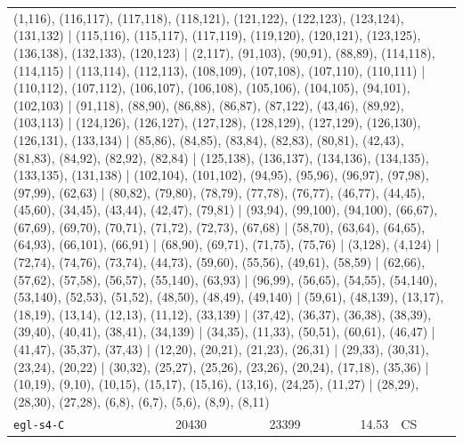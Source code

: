 \begin{longtable}{lrrrl}
\multicolumn{5}{p{0.96\linewidth}}{\tiny\raggedright\arraybackslash (1,116), (116,117), (117,118), (118,121), (121,122), (122,123), (123,124), (131,132) | (115,116), (115,117), (117,119), (119,120), (120,121), (123,125), (136,138), (132,133), (120,123) | (2,117), (91,103), (90,91), (88,89), (114,118), (114,115) | (113,114), (112,113), (108,109), (107,108), (107,110), (110,111) | (110,112), (107,112), (106,107), (106,108), (105,106), (104,105), (94,101), (102,103) | (91,118), (88,90), (86,88), (86,87), (87,122), (43,46), (89,92), (103,113) | (124,126), (126,127), (127,128), (128,129), (127,129), (126,130), (126,131), (133,134) | (85,86), (84,85), (83,84), (82,83), (80,81), (42,43), (81,83), (84,92), (82,92), (82,84) | (125,138), (136,137), (134,136), (134,135), (133,135), (131,138) | (102,104), (101,102), (94,95), (95,96), (96,97), (97,98), (97,99), (62,63) | (80,82), (79,80), (78,79), (77,78), (76,77), (46,77), (44,45), (45,60), (34,45), (43,44), (42,47), (79,81) | (93,94), (99,100), (94,100), (66,67), (67,69), (69,70), (70,71), (71,72), (72,73), (67,68) | (58,70), (63,64), (64,65), (64,93), (66,101), (66,91) | (68,90), (69,71), (71,75), (75,76) | (3,128), (4,124) | (72,74), (74,76), (73,74), (44,73), (59,60), (55,56), (49,61), (58,59) | (62,66), (57,62), (57,58), (56,57), (55,140), (63,93) | (96,99), (56,65), (54,55), (54,140), (53,140), (52,53), (51,52), (48,50), (48,49), (49,140) | (59,61), (48,139), (13,17), (18,19), (13,14), (12,13), (11,12), (33,139) | (37,42), (36,37), (36,38), (38,39), (39,40), (40,41), (38,41), (34,139) | (34,35), (11,33), (50,51), (60,61), (46,47) | (41,47), (35,37), (37,43) | (12,20), (20,21), (21,23), (26,31) | (29,33), (30,31), (23,24), (20,22) | (30,32), (25,27), (25,26), (23,26), (20,24), (17,18), (35,36) | (10,19), (9,10), (10,15), (15,17), (15,16), (13,16), (24,25), (11,27) | (28,29), (28,30), (27,28), (6,8), (6,7), (5,6), (8,9), (8,11)} \\[2pt]
\texttt{egl-s4-C} & 20430 & 23399 & 14.53 & CS \\

\end{longtable}
